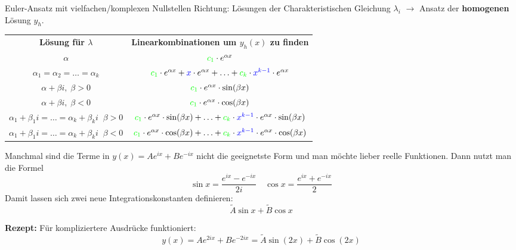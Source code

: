\begin{Rezept}{Euler-Ansatz mit vielfachen/komplexen Nullstellen}{}
	Richtung: Lösungen der Charakteristischen Gleichung $\lambda_i$ $\to$ Ansatz der \textbf{homogenen} Lösung $y_h$.

    \begin{tabular}{c|c}
         \textbf{Lösung für $\lambda$} & \textbf{Linearkombinationen um $y_h(x)$ zu finden}\\
         $\alpha$ & ${\color{green}c_1} \cdot e^{\alpha x}$\\
         $\alpha_1 = \alpha_2 = \ldots = \alpha_k$ & ${\color{green}c_1} \cdot e^{\alpha x} + {\color{blue} x} \cdot e^{\alpha x} + \ldots + {\color{green}c_k} \cdot {\color{blue} x^{k-1}} \cdot e^{\alpha x}$\\
         $\alpha + \beta i, \; \beta>0$ & ${\color{green}c_1} \cdot e^{\alpha x} \cdot \sin(\beta x)$\\
         $\alpha + \beta i, \; \beta<0$ & ${\color{green}c_1} \cdot e^{\alpha x} \cdot \cos(\beta x)$\\
         $\alpha_1 + \beta_1 i = \ldots = \alpha_k + \beta_k i \;\; \beta>0$ & ${\color{green}c_1} \cdot e^{\alpha x} \cdot \sin(\beta x) + \ldots + {\color{green}c_k} \cdot {\color{blue} x^{k-1}} \cdot e^{\alpha x} \cdot \sin(\beta x)$\\
         $\alpha_1 + \beta_1 i = \ldots = \alpha_k + \beta_k i \;\; \beta<0$ & ${\color{green}c_1} \cdot e^{\alpha x} \cdot \cos(\beta x) + \ldots + {\color{green}c_k} \cdot {\color{blue} x^{k-1}} \cdot e^{\alpha x} \cdot \cos(\beta x)$\\
    \end{tabular}
\end{Rezept}

\begin{Diverses}{}{}
	Manchmal sind die Terme in $y(x) = Ae^{ix} + Be^{-ix}$ nicht die geeignetste Form und man möchte lieber reelle Funktionen. Dann nutzt man die Formel 
	\[
		\sin x = \frac{e^{ix} - e^{-ix}}{2i} \quad
    	\cos x = \frac{e^{ix} + e^{-ix}}{2}
    \]
	Damit lassen sich zwei neue Integrationskonstanten definieren: \[\widetilde{A} \sin x + \widetilde{B} \cos x\]
	
	\textbf{Rezept:} Für kompliziertere Ausdrücke funktioniert:
	\[
	    y(x) = Ae^{2ix} + Be^{-2ix} = \widetilde{A} \sin (2x) + \widetilde{B} \cos (2x)
	\]
\end{Diverses}

